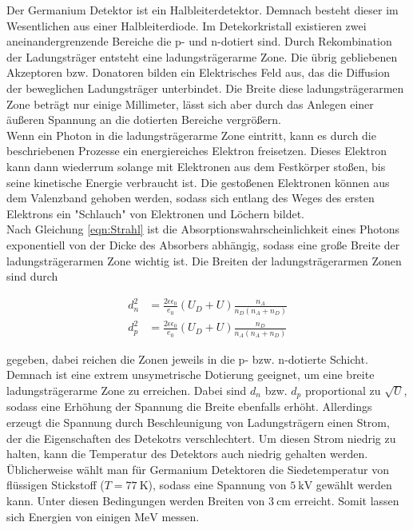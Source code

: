 Der Germanium Detektor ist ein Halbleiterdetektor. Demnach besteht dieser im Wesentlichen aus einer Halbleiterdiode. Im Detekorkristall 
existieren zwei aneinandergrenzende Bereiche die p- und n-dotiert sind. Durch Rekombination der Ladungsträger entsteht eine ladungsträgerarme 
Zone. Die übrig gebliebenen Akzeptoren bzw. Donatoren bilden ein Elektrisches Feld aus, das die Diffusion der beweglichen Ladungsträger unterbindet. 
Die Breite diese ladungsträgerarmen Zone beträgt nur einige Millimeter, lässt sich aber durch das Anlegen einer äußeren Spannung an die dotierten 
Bereiche vergrößern. \\
Wenn ein Photon in die ladungsträgerarme Zone eintritt, kann es durch die beschriebenen Prozesse ein energiereiches Elektron freisetzen. Dieses Elektron
kann dann wiederrum solange mit Elektronen aus dem Festkörper stoßen, bis seine kinetische Energie verbraucht ist. Die gestoßenen Elektronen können 
aus dem Valenzband gehoben werden, sodass sich entlang des Weges des ersten Elektrons ein "Schlauch" von Elektronen und Löchern bildet.\\
Nach Gleichung \eqref{eqn:Strahl} ist die Absorptionswahrscheinlichkeit eines Photons exponentiell von der Dicke des Absorbers abhängig, 
sodass eine große Breite der ladungsträgerarmen Zone wichtig ist. Die Breiten der ladungsträgerarmen Zonen sind durch 

\begin{align}
    d_n^2 &= \frac{2\epsilon\epsilon_0}{e_0}\left(U_D+U\right)\frac{n_A}{n_D\left(n_A+n_D\right)}\\
    d_p^2 &= \frac{2\epsilon\epsilon_0}{e_0}\left(U_D+U\right)\frac{n_D}{n_A\left(n_A+n_D\right)}
\end{align}

gegeben, dabei reichen die Zonen jeweils in die p- bzw. n-dotierte Schicht. Demnach ist eine extrem unsymetrische Dotierung geeignet, um eine 
breite ladungsträgerarme Zone zu erreichen. Dabei sind $d_n$ bzw. $d_p$ proportional zu $\sqrt{U}$, sodass eine Erhöhung der Spannung die Breite 
ebenfalls erhöht. Allerdings erzeugt die Spannung durch Beschleunigung von Ladungsträgern einen Strom, der die Eigenschaften des Detekotrs 
verschlechtert. Um diesen Strom niedrig zu halten, kann die Temperatur des Detektors auch niedrig gehalten werden. Üblicherweise wählt man 
für Germanium Detektoren die Siedetemperatur von flüssigen Stickstoff ($T=\SI{77}{\kelvin}$), sodass eine Spannung von $\SI{5}{\kilo\volt}$
gewählt werden kann. Unter diesen Bedingungen werden Breiten von $\SI{3}{\centi\meter}$ erreicht. Somit lassen sich Energien von einigen $\si{\mega\eV}$
messen.  
  
